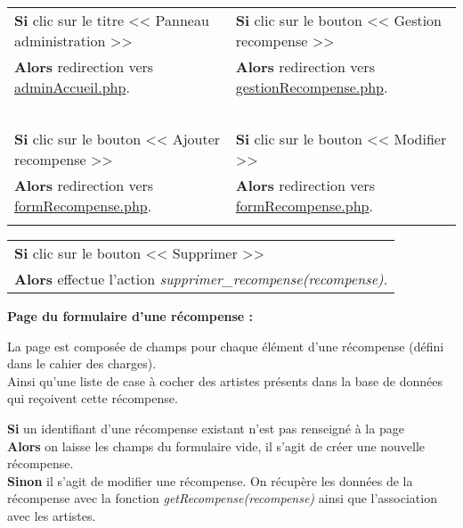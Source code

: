             \begin{center}
                \begin{tabular}{l | l}
                    \textbf{Si} clic sur le titre << Panneau administration >> & \textbf{Si} clic sur le bouton << Gestion recompense >> \\
                    \textbf{Alors} redirection vers \underline{adminAccueil.php}. & \textbf{Alors} redirection vers \underline{gestionRecompense.php}. \\ \\

                    \textbf{Si} clic sur le bouton << Ajouter recompense >> & \textbf{Si} clic sur le bouton << Modifier >> \\
                    \textbf{Alors} redirection vers \underline{formRecompense.php}. & \textbf{Alors} redirection vers \underline{formRecompense.php}. \\ \\
                \end{tabular}

                \begin{tabular}{l}
                    \textbf{Si} clic sur le bouton << Supprimer >> \\
                    \textbf{Alors} effectue l'action \emph{supprimer\_recompense(recompense)}.
                \end{tabular}
            \end{center}
            
            
        \clearpage
        
            \begin{paragraphe}
                \textbf{Page du formulaire d'une récompense :}
            \end{paragraphe}
            
            \begin{paragraphe}
                La page est composée de champs pour chaque élément d'une récompense (défini dans le cahier des charges). \\
                Ainsi qu'une liste de case à cocher des artistes présents dans la base de données qui reçoivent cette récompense.
            \end{paragraphe}

            \begin{paragraphe}
                \textbf{Si} un identifiant d'une récompense existant n'est pas renseigné à la page \\
                \textbf{Alors} on laisse les champs du formulaire vide, il s'agit de créer une nouvelle récompense. \\
                \textbf{Sinon} il s'agit de modifier une récompense. On récupère les données de la récompense avec la fonction \emph{getRecompense(recompense)} ainsi que l'association avec les artistes.
            \end{paragraphe}
            
